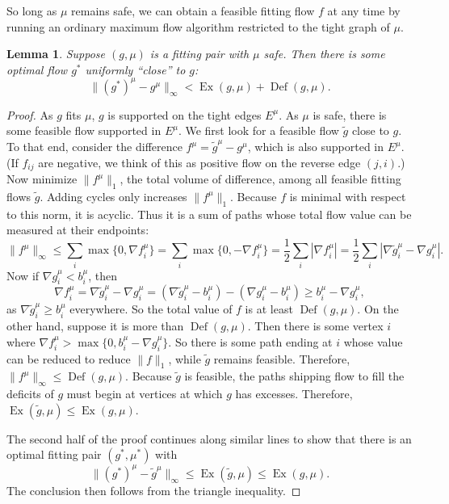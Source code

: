 \documentclass[11pt]{article}
\newtheorem{lemma}[theorem]{Lemma}
\theoremstyle{definition}
\theoremstyle{definition}
\newcommand{\fu}{f^{\mu}}
\newcommand{\nfiu}{\nabla \fu_i}
\newcommand{\biu}{b_{i}^{\mu}}
\DeclareMathOperator{\Ex}{Ex}
\DeclareMathOperator{\Def}{Def}
\begin{document}
    So long as $\mu$ remains safe, we can obtain a feasible fitting flow $f$ at any time
    by running an ordinary maximum flow algorithm restricted to the tight graph of $\mu$.
    
    \begin{lemma} \label{lem.dist}
    Suppose $(g, \mu)$ is a fitting pair with $\mu$ safe. Then there is some optimal flow $g^*$
    uniformly ``close'' to $g$:
    \[ \|(g^*)^\mu - g^\mu\|_\infty < \Ex(g, \mu) + \Def(g, \mu). \]
    \end{lemma}
    \begin{proof}
    As $g$ fits $\mu$, $g$ is supported on the tight edges $E^\mu$. As
    $\mu$ is safe, there is some feasible flow supported in $E^\mu$. We first
    look for a feasible flow $\tilde{g}$ close to $g$. To that end, consider the
    difference $f^\mu = \tilde{g}^\mu - g^\mu$, which is also supported in $E^\mu$.
    (If $f_{ij}$ are negative, we think of this as positive flow on the reverse edge $(j, i)$.)
    Now minimize $\|f^\mu\|_1$, the total volume of difference,
    among all feasible fitting flows $\tilde{g}$. Adding cycles only increases $\|f^\mu\|_1$.
    Because $f$ is minimal with respect to this norm, it is acyclic. Thus it is a sum of
    paths whose total flow value can be measured at their endpoints:
    \[ \|f^\mu\|_\infty \leq \sum_i \max\{0, \nfiu\} = \sum_i \max\{0, -\nfiu\} = \frac{1}{2}\sum_i |\nfiu|
     = \frac{1}{2}\sum_i |\nabla \tilde{g}^\mu_i - \nabla g^\mu_i|. \]
    Now if $\nabla g_i^\mu < b_i^\mu$, then
    \[ \nfiu = \nabla \tilde{g}_i^\mu - \nabla g_i^\mu
     = (\nabla \tilde{g}_i^\mu - b_i^\mu) - (\nabla g_i^\mu - b_i^\mu) \geq b_i^\mu - \nabla g_i^\mu, \]
    as $\nabla \tilde{g}_i^\mu \geq b_i^\mu$ everywhere. So the total value of $f$ is at least
    $\Def(g, \mu)$. On the other hand, suppose it is more than $\Def(g, \mu)$. Then there
    is some vertex $i$ where $\nfiu > \max\{0, \biu - \nabla g_i^\mu\}$. So there is some path
    ending at $i$ whose value can be reduced to reduce $\|f\|_1$, while $\tilde{g}$
    remains feasible. Therefore, $\|f^\mu\|_\infty \leq \Def(g, \mu)$. Because $\tilde{g}$ is feasible,
    the paths shipping flow to fill the deficits of $g$ must begin at vertices at which $g$ has
    excesses. Therefore, $\Ex(\tilde{g}, \mu) \leq \Ex(g, \mu)$.
    
    The second half of the proof continues along similar lines to show that there is an optimal
    fitting pair $(g^*, \mu^*)$ with
    \[ \|(g^*)^\mu - \tilde{g}^\mu\|_\infty \leq \Ex(\tilde{g}, \mu) \leq \Ex(g, \mu). \]
    The conclusion then follows from the triangle inequality.
    
    \end{proof}
    
\end{document}
